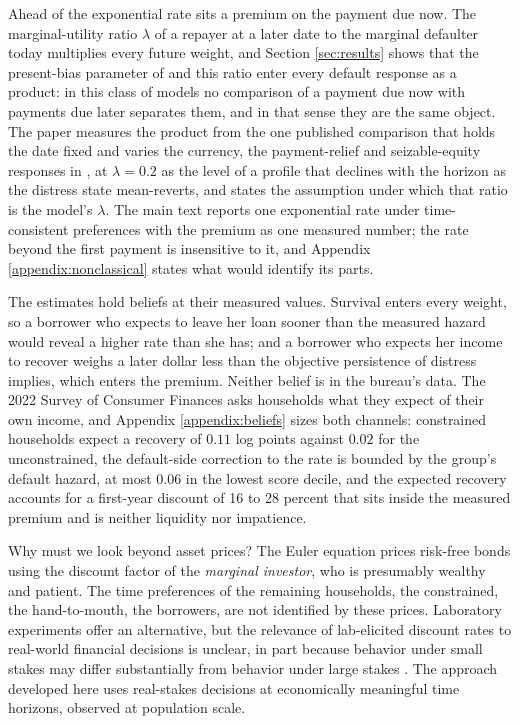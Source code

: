 Ahead of the exponential rate sits a premium on the payment due now. The marginal-utility ratio $\lambda$ of a repayer at a later date to the marginal defaulter today multiplies every future weight, and Section \ref{sec:results} shows that the present-bias parameter of \citet{laibson_golden_1997} and this ratio enter every default response as a product: in this class of models no comparison of a payment due now with payments due later separates them, and in that sense they are the same object. The paper measures the product from the one published comparison that holds the date fixed and varies the currency, the payment-relief and seizable-equity responses in \citet{indarte_moral_2023}, at $\lambda = 0.2$ as the level of a profile that declines with the horizon as the distress state mean-reverts, and states the assumption under which that ratio is the model's $\lambda$. The main text reports one exponential rate under time-consistent preferences with the premium as one measured number; the rate beyond the first payment is insensitive to it, and Appendix \ref{appendix:nonclassical} states what would identify its parts.

The estimates hold beliefs at their measured values. Survival enters every weight, so a borrower who expects to leave her loan sooner than the measured hazard would reveal a higher rate than she has; and a borrower who expects her income to recover weighs a later dollar less than the objective persistence of distress implies, which enters the premium. Neither belief is in the bureau's data. The 2022 Survey of Consumer Finances asks households what they expect of their own income, and Appendix \ref{appendix:beliefs} sizes both channels: constrained households expect a recovery of $0.11$ log points against $0.02$ for the unconstrained, the default-side correction to the rate is bounded by the group's default hazard, at most $0.06$ in the lowest score decile, and the expected recovery accounts for a first-year discount of 16 to 28 percent that sits inside the measured premium and is neither liquidity nor impatience.

Why must we look beyond asset prices? The Euler equation prices risk-free bonds using the discount factor of the \emph{marginal investor}, who is presumably wealthy and patient. The time preferences of the remaining households, the constrained, the hand-to-mouth, the borrowers, are not identified by these prices. Laboratory experiments offer an alternative, but the relevance of lab-elicited discount rates to real-world financial decisions is unclear, in part because behavior under small stakes may differ substantially from behavior under large stakes \citep{coller_eliciting_1999, harrison_estimating_2002, rabin_risk_2000}. The approach developed here uses real-stakes decisions at economically meaningful time horizons, observed at population scale.

